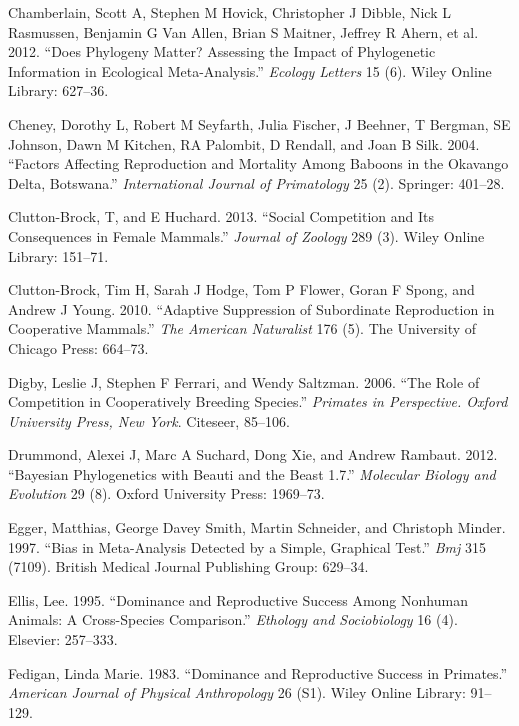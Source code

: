 \documentclass[]{article}
\begin{document}
\leavevmode\hypertarget{ref-chamberlain2012does}{}%
Chamberlain, Scott A, Stephen M Hovick, Christopher J Dibble, Nick L
Rasmussen, Benjamin G Van Allen, Brian S Maitner, Jeffrey R Ahern, et
al. 2012. ``Does Phylogeny Matter? Assessing the Impact of Phylogenetic
Information in Ecological Meta-Analysis.'' \emph{Ecology Letters} 15
(6). Wiley Online Library: 627--36.

\leavevmode\hypertarget{ref-cheney2004factors}{}%
Cheney, Dorothy L, Robert M Seyfarth, Julia Fischer, J Beehner, T
Bergman, SE Johnson, Dawn M Kitchen, RA Palombit, D Rendall, and Joan B
Silk. 2004. ``Factors Affecting Reproduction and Mortality Among Baboons
in the Okavango Delta, Botswana.'' \emph{International Journal of
Primatology} 25 (2). Springer: 401--28.

\leavevmode\hypertarget{ref-clutton2013social}{}%
Clutton-Brock, T, and E Huchard. 2013. ``Social Competition and Its
Consequences in Female Mammals.'' \emph{Journal of Zoology} 289 (3).
Wiley Online Library: 151--71.

\leavevmode\hypertarget{ref-clutton2010adaptive}{}%
Clutton-Brock, Tim H, Sarah J Hodge, Tom P Flower, Goran F Spong, and
Andrew J Young. 2010. ``Adaptive Suppression of Subordinate Reproduction
in Cooperative Mammals.'' \emph{The American Naturalist} 176 (5). The
University of Chicago Press: 664--73.

\leavevmode\hypertarget{ref-digby2006role}{}%
Digby, Leslie J, Stephen F Ferrari, and Wendy Saltzman. 2006. ``The Role
of Competition in Cooperatively Breeding Species.'' \emph{Primates in
Perspective. Oxford University Press, New York}. Citeseer, 85--106.

\leavevmode\hypertarget{ref-drummond2012bayesian}{}%
Drummond, Alexei J, Marc A Suchard, Dong Xie, and Andrew Rambaut. 2012.
``Bayesian Phylogenetics with Beauti and the Beast 1.7.''
\emph{Molecular Biology and Evolution} 29 (8). Oxford University Press:
1969--73.

\leavevmode\hypertarget{ref-egger1997bias}{}%
Egger, Matthias, George Davey Smith, Martin Schneider, and Christoph
Minder. 1997. ``Bias in Meta-Analysis Detected by a Simple, Graphical
Test.'' \emph{Bmj} 315 (7109). British Medical Journal Publishing Group:
629--34.

\leavevmode\hypertarget{ref-ellis1995dominance}{}%
Ellis, Lee. 1995. ``Dominance and Reproductive Success Among Nonhuman
Animals: A Cross-Species Comparison.'' \emph{Ethology and Sociobiology}
16 (4). Elsevier: 257--333.

\leavevmode\hypertarget{ref-fedigan1983dominance}{}%
Fedigan, Linda Marie. 1983. ``Dominance and Reproductive Success in
Primates.'' \emph{American Journal of Physical Anthropology} 26 (S1).
Wiley Online Library: 91--129.
\end{document}
